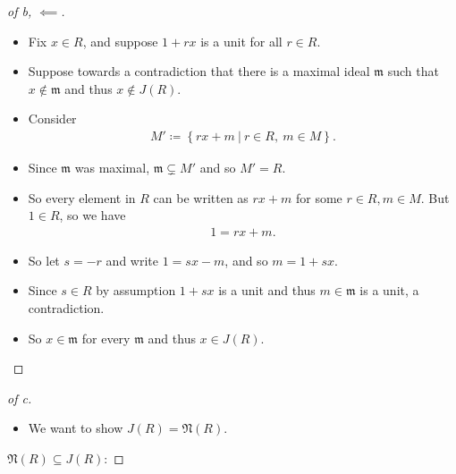 \begin{solution}
\begin{proof}[of b, $\impliedby$]
\begin{itemize}
\item
  Fix \(x\in R\), and suppose \(1+rx\) is a unit for all \(r\in R\).
\item
  Suppose towards a contradiction that there is a maximal ideal
  \(\mathfrak{m}\) such that \(x\not \in \mathfrak{m}\) and thus
  \(x\not\in J(R)\).
\item
  Consider
  \begin{align*}
  M' \coloneqq\left\{{rx + m {~\mathrel{\Big|}~}r\in R,~ m\in M}\right\}
  .\end{align*}
\item
  Since \(\mathfrak{m}\) was maximal, \(\mathfrak{m} \subsetneq M'\) and
  so \(M' = R\).
\item
  So every element in \(R\) can be written as \(rx + m\) for some
  \(r\in R, m\in M\). But \(1\in R\), so we have
  \begin{align*}
  1 = rx + m
  .\end{align*}
\item
  So let \(s = -r\) and write \(1 = sx - m\), and so \(m = 1 + sx\).
\item
  Since \(s\in R\) by assumption \(1+sx\) is a unit and thus
  \(m \in \mathfrak{m}\) is a unit, a contradiction.
\item
  So \(x\in \mathfrak{m}\) for every \(\mathfrak{m}\) and thus
  \(x\in J(R)\).
\end{itemize}

\end{proof}

\begin{proof}[of c]

\begin{itemize}
\tightlist
\item
  We want to show \(J(R) = \mathfrak N(R)\).
\end{itemize}

\(\mathfrak N(R) \subseteq J(R)\):


\end{proof}
\end{solution}
